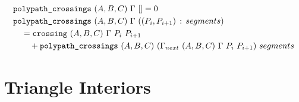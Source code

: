 \begin{equation}
\begin{aligned}
&\texttt{polypath\_crossings}\ (A,B,C)\ \Gamma\ [] = 0\\
&\texttt{polypath\_crossings}\ (A,B,C)\ \Gamma\ ((P_i,P_{i+1})\,:\,segments)\\
 &\quad= \texttt{crossing}\ (A,B,C)\ \Gamma\ P_i\ P_{i+1}\\
 &\qquad+ \texttt{polypath\_crossings}\ (A,B,C)\ (\Gamma_{next}\ (A,B,C)\ \Gamma\ P_i\ P_{i+1})\ segments
\end{aligned}
\end{equation}


\section{Triangle Interiors}\label{sec:TriangleInteriorDefinition}

